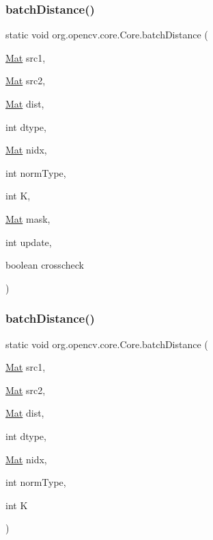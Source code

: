 \subsubsection{\texorpdfstring{batch\+Distance()}{batchDistance()}\hspace{0.1cm}{\footnotesize\ttfamily [1/3]}}
{\footnotesize\ttfamily static void org.\+opencv.\+core.\+Core.\+batch\+Distance (\begin{DoxyParamCaption}\item[{\mbox{\hyperlink{classorg_1_1opencv_1_1core_1_1_mat}{Mat}}}]{src1,  }\item[{\mbox{\hyperlink{classorg_1_1opencv_1_1core_1_1_mat}{Mat}}}]{src2,  }\item[{\mbox{\hyperlink{classorg_1_1opencv_1_1core_1_1_mat}{Mat}}}]{dist,  }\item[{int}]{dtype,  }\item[{\mbox{\hyperlink{classorg_1_1opencv_1_1core_1_1_mat}{Mat}}}]{nidx,  }\item[{int}]{norm\+Type,  }\item[{int}]{K,  }\item[{\mbox{\hyperlink{classorg_1_1opencv_1_1core_1_1_mat}{Mat}}}]{mask,  }\item[{int}]{update,  }\item[{boolean}]{crosscheck }\end{DoxyParamCaption})\hspace{0.3cm}{\ttfamily [static]}}

\mbox{\label{classorg_1_1opencv_1_1core_1_1_core_a1a20f1a6cd9f3fb0278657f1c9fe22bb}} 
\subsubsection{\texorpdfstring{batch\+Distance()}{batchDistance()}\hspace{0.1cm}{\footnotesize\ttfamily [2/3]}}
{\footnotesize\ttfamily static void org.\+opencv.\+core.\+Core.\+batch\+Distance (\begin{DoxyParamCaption}\item[{\mbox{\hyperlink{classorg_1_1opencv_1_1core_1_1_mat}{Mat}}}]{src1,  }\item[{\mbox{\hyperlink{classorg_1_1opencv_1_1core_1_1_mat}{Mat}}}]{src2,  }\item[{\mbox{\hyperlink{classorg_1_1opencv_1_1core_1_1_mat}{Mat}}}]{dist,  }\item[{int}]{dtype,  }\item[{\mbox{\hyperlink{classorg_1_1opencv_1_1core_1_1_mat}{Mat}}}]{nidx,  }\item[{int}]{norm\+Type,  }\item[{int}]{K }\end{DoxyParamCaption})\hspace{0.3cm}{\ttfamily [static]}}

